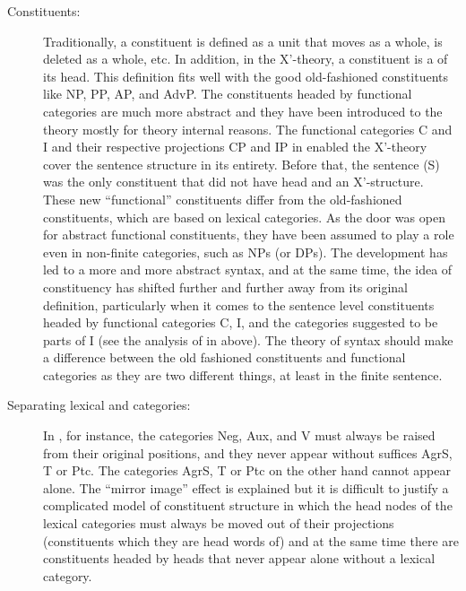 \documentclass[output=paper]{langsci/langscibook}
\begin{document}
\begin{description}\item[Constituents:] Traditionally, a constituent is defined as a unit that moves as a whole, is deleted as a whole, etc. In addition, in the X’-theory, a constituent is a  of its head. This definition fits well with the good old-fashioned constituents like NP, PP, AP, and AdvP. The constituents headed by functional categories are much more abstract and they have been introduced to the theory mostly for theory internal reasons. The functional categories C and I and their respective projections CP and IP in \citet{Chomsky1986} enabled the X’-theory cover the sentence structure in its entirety. Before that, the sentence (S) was the only constituent that did not have head and an X’-structure. These new “functional” constituents differ from the old-fashioned constituents, which are based on lexical categories.  As the door was open for abstract functional constituents, they have been assumed to play a role even in non-finite categories, such as NPs (or DPs). The development has led to a more and more abstract syntax, and at the same time, the idea of constituency has shifted further and further away from its original definition, particularly when it comes to the sentence level constituents headed by functional categories C, I, and the categories suggested to be parts of I (see the analysis of  in  above). The theory of syntax should make a difference between the old fashioned constituents and functional categories as they are two different things, at least in the finite sentence. 

\item[Separating lexical and  categories:] In , for instance, the categories Neg, Aux, and V must always be raised from their original positions, and they never appear without \largerpage[2] suffices AgrS, T or Ptc. The categories AgrS, T or Ptc on the other hand cannot appear alone. The “mirror image” effect is explained but it is difficult to justify a complicated model of constituent structure in which the head nodes of the lexical categories must always be moved out of their projections (constituents which they are head words of) and at the same time there are constituents headed by heads that never appear alone without a lexical category.\end{description}
                                                                                                                                                                                                                                                                                                                                                                                                                                                                                                                                                                                                                                                                                             
\end{document}
